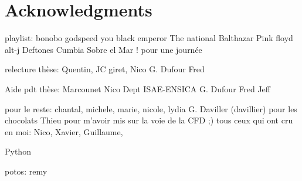 
\chapter*{Acknowledgments}
\thispagestyle{empty}

playlist:
bonobo
godspeed you black emperor
The national
Balthazar
Pink floyd
alt-j
Deftones
Cumbia Sobre el Mar ! pour une journée

relecture thèse:
Quentin,
JC giret,
Nico
G. Dufour
Fred

Aide pdt thèse:
Marcounet
Nico
Dept ISAE-ENSICA
G. Dufour
Fred
Jeff

pour le reste:
chantal, michele, marie, nicole, lydia
G. Daviller (davillier) pour les chocolats
Thieu pour m'avoir mis sur la voie de la CFD ;)
tous ceux qui ont cru en moi: Nico, Xavier, Guillaume, 

Python 

potos:
remy